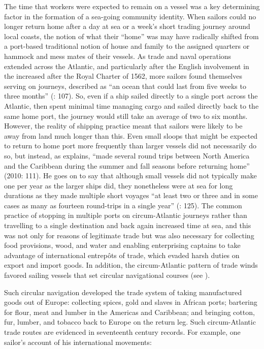 The time that workers were expected to remain on a vessel was a key determining factor in the formation of a sea-going community identity. When sailors could no longer return home after a day at sea or a week’s short trading journey around local coasts, the notion of what their “home” was may have radically shifted from a port-based traditional notion of house and family to the assigned quarters or hammock and mess mates of their vessels. As trade and naval operations extended across the Atlantic, and particularly after the English involvement in the  increased after the Royal Charter of 1562, more sailors found themselves serving on  journeys, described as “an ocean  that could last from five weeks to three months” (\citealt{Brown2011}: 107). So, even if a ship sailed directly to a single port across the Atlantic, then spent minimal time managing cargo and sailed directly back to the same home port, the journey would still take an average of two to six months. However, the reality of shipping practice meant that sailors were likely to be away from land much longer than this. Even small sloops that might be expected to return to home port more frequently than larger vessels did not necessarily do so, but instead, as \citeauthor{Jarvis2010} explains, “made several round trips between North America and the Caribbean during the summer and fall seasons before returning home” (2010: 111).  He goes on to say that although small vessels did not typically make one   per year as the larger ships did, they nonetheless were at sea for long durations as they made multiple short voyages “at least two or three and in some cases as many as fourteen round-trips in a single year” (\citealt{Jarvis2010}: 125). The common practice of stopping in multiple ports on circum-Atlantic journeys rather than travelling to a single destination and back again increased time at sea, and this was not only for reasons of legitimate trade but was also necessary for collecting food provisions, wood, and water and enabling enterprising captains to take advantage of international entrepôts of trade, which evaded harsh duties on export and import goods. In addition, the circum-Atlantic pattern of trade winds favored sailing vessels that set circular navigational courses (see ). 

Such circular navigation developed the trade system of taking manufactured goods out of Europe: collecting spices, gold and slaves in African ports; bartering for flour, meat and lumber in the Americas and Caribbean; and bringing cotton, fur, lumber, and tobacco back to Europe on the return leg. Such circum-Atlantic trade routes are evidenced in  {seventeenth century} records. For example, one  {sailor}’s account of his international movements:


